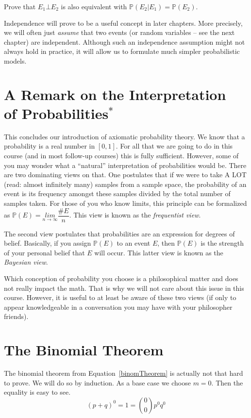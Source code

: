 \begin{Exercise}
 Prove that $E_1 \bot E_2$ is also equivalent with $\mathbb{P}(E_{2}|E_{1}) = \mathbb{P}(E_{2}) $. 
\end{Exercise}

Independence will prove to be a useful concept in later chapters. More precisely, we will often
just \textit{assume} that two events (or random variables -- see the next chapter) are independent. Although
such an independence assumption might not always hold in practice, it will allow us to formulate much simpler probabilistic models.


\section{A Remark on the Interpretation \\ of Probabilities$^{*}$}

This concludes our introduction of axiomatic probability theory. We know that a probability is
a real number in $ [0,1] $. For all that we are going to do in this course (and in most follow-up courses)
this is fully sufficient. However, some of you may wonder what a ``natural'' interpretation of probabilities
would be. There are two dominating views on that. One postulates that if we were to take A LOT (read: almost
infinitely many) samples from a sample space, the probability of an event is its frequency amongst these
samples divided by the total number of samples taken. For those of you who know limits, this principle can be
formalized as $ \mathbb{P}(E) = \underset{n \rightarrow \infty}{lim} \dfrac{\#E}{n} $. This view
is known as the \emph{frequentist view}.

The second view postulates that probabilities are an expression for degrees of belief. Basically, 
if you assign $ \mathbb{P}(E) $ to an event $ E $, then $ \mathbb{P}(E) $ is the strength of your personal belief that
$ E $ will occur. This latter view is known as the \emph{Bayesian view}.

Which conception of probability you choose is a philosophical matter and does not really impact the math.
That is why we will not care about this issue in this course. However, it is useful to at least be aware
of these two views (if only to appear knowledgeable in a conversation you may have with your philosopher 
friends).


\section{The Binomial Theorem}
The binomial theorem from Equation~\ref{binomTheorem} is actually not that hard to prove. We will do so by
induction. As a base case we choose $ m = 0 $. Then the equality is easy to see.
\begin{equation}
(p + q)^{0} = 1 = \binom{0}{0}p^{0}q^{0}
\end{equation}

